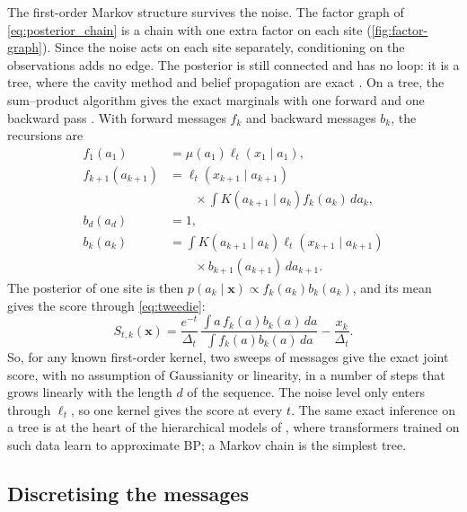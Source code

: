 \documentclass{article}
\begin{document}
The first-order Markov structure survives the noise. The factor graph of \cref{eq:posterior_chain} is a chain with one
extra factor on each site (\cref{fig:factor-graph}). Since the noise acts on each site separately, conditioning on the
observations adds no edge. The posterior is still connected and has no loop: it is a tree, where the cavity method and
belief propagation are exact \cite{mezard2001bethe,mezard2006reconstruction,mezard2009information}. On a tree, the
sum--product algorithm gives the exact marginals with one forward and one backward pass
\cite{pearl1988probabilistic,kschischang2001factor,yedidia2003understanding}. With forward messages $f_k$ and backward
messages $b_k$, the recursions are
\begin{align}
    f_1(a_1)
    &=\mu(a_1)\ell_t(x_1\mid a_1),\nonumber\\
    f_{k+1}(a_{k+1})
    &=\ell_t(x_{k+1}\mid a_{k+1})\nonumber\\
    &\qquad\times\int K(a_{k+1}\mid a_k)f_k(a_k)\,da_k,\nonumber\\
    b_d(a_d)&=1,\nonumber\\
    b_k(a_k)
    &=\int K(a_{k+1}\mid a_k)
      \ell_t(x_{k+1}\mid a_{k+1})\nonumber\\
    &\qquad\times b_{k+1}(a_{k+1})\,da_{k+1}.
    \label{eq:bp}
\end{align}
The posterior of one site is then $p(a_k\mid\mathbf x)\propto f_k(a_k)b_k(a_k)$, and its mean gives the score through
\cref{eq:tweedie}:
\begin{equation}
    S_{t,k}(\mathbf x)=\frac{e^{-t}}{\Delta_t}\,
    \frac{\int a\,f_k(a)b_k(a)\,da}{\int f_k(a)b_k(a)\,da}-\frac{x_k}{\Delta_t}.
\end{equation}
So, for any known first-order kernel, two sweeps of messages give the exact joint score, with no assumption of
Gaussianity or linearity, in a number of steps that grows linearly with the length $d$ of the sequence. The noise level
only enters through $\ell_t$, so one kernel gives the score at every $t$. The same exact inference on a tree is at the
heart of the hierarchical models of \cite{garnierbrun2024transformers}, where transformers trained on such data learn to
approximate BP; a Markov chain is the simplest tree.

\subsection{Discretising the messages}
\label{sec:grid}
\end{document}
